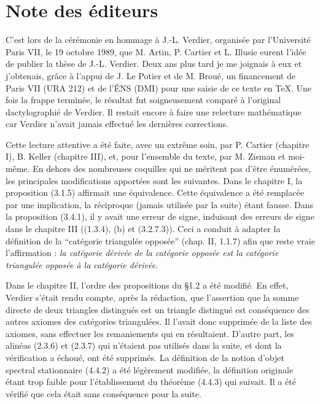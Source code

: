 \chapter*{Note des éditeurs}

C'est lors de la cérémonie en hommage à J.-L. Verdier, organisée par
l'Université Paris VII, le 19 octobre 1989, que M. Artin, P. Cartier et
L. Illusie eurent l'idée de publier la thèse de J.-L. Verdier. Deux ans plus
tard je me joignais à eux et j'obtenais, grâce à l'appui de J. Le Potier et de
M. Broué, un financement de Paris VII (URA 212) et de l'ÉNS (DMI) pour une
saisie de ce texte en \TeX{}. Une fois la frappe terminée, le résultat fut
soigneusement comparé à l'original dactylographié de Verdier. Il restait encore
à faire une relecture mathématique car Verdier n'avait jamais effectué les
dernières corrections.

Cette lecture attentive a été faite, avec un extrême soin, par P. Cartier
(chapitre I), B. Keller (chapitre III), et, pour l'ensemble du texte, par
M. Zisman et moi-même. En dehors des nombreuses coquilles qui ne méritent pas
d'être énumérées, les principales modifications apportées sont les suivantes.
Dans le chapitre I, la proposition (3.1.5) affirmait une équivalence. Cette
équivalence a été remplacée par une implication, la réciproque (jamais utilisée
par la suite) étant fausse. Dans la proposition (3.4.1), il y avait une erreur
de signe, induisant des erreurs de signe dans le chapitre III ((1.3.4), (b) et
(3.2.7.3)). Ceci a conduit à adapter la définition de la “catégorie triangulée
opposée” (chap. II, 1.1.7) afin que reste vraie l'affirmation :
\emph{la catégorie dérivée de la catégorie opposée est la catégorie triangulée
opposée à la catégorie dérivée}.

Dans le chapitre II, l'ordre des propositions du §1.2 a été modifié. En effet,
Verdier s'était rendu compte, après la rédaction, que l'assertion que la somme
directe de deux triangles distingués est un triangle distingué est conséquence
des autres axiomes des catégories triangulées. Il l'avait donc supprimée de la
liste des axiomes, sans effectuer les remaniements qui en résultaient. D'autre
part, les alinéas (2.3.6) et (2.3.7) qui n'étaient pas utilisés dans la suite,
et dont la vérification a échoué, ont été supprimés. La définition de la notion
d'objet spectral stationnaire (4.4.2) a été légèrement modifiée, la définition
originale étant trop faible pour l'établissement du théorème (4.4.3) qui
suivait. Il a été vérifié que cela était sans conséquence pour la suite.


